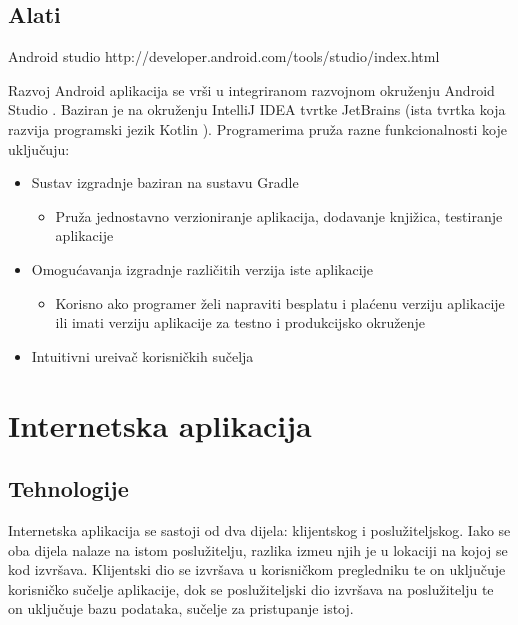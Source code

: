 \subsection{Alati}
Android studio
http://developer.android.com/tools/studio/index.html

Razvoj Android aplikacija se vr\v{s}i u integriranom razvojnom okru\v{z}enju Android Studio \cite{androidStudio}. Baziran je na okru\v{z}enju IntelliJ IDEA \cite{inteliJ} tvrtke JetBrains (ista tvrtka koja razvija programski jezik Kotlin \cite{kotlin}). Programerima pru\v{z}a razne funkcionalnosti koje uklju\v{c}uju:

\begin{itemize}
		\item Sustav izgradnje baziran na sustavu Gradle \cite{gradle}
		\begin{itemize}
			\item Pru\v{z}a jednostavno verzioniranje aplikacija, dodavanje knji\v{z}ica, testiranje aplikacije
		\end{itemize}
		\item Omogu\'{c}avanja izgradnje razli\v{c}itih verzija iste aplikacije
		\begin{itemize}
			\item Korisno ako programer \v{z}eli napraviti besplatu i pla\'{c}enu verziju aplikacije ili imati verziju aplikacije za testno i produkcijsko okru\v{z}enje
		\end{itemize}
		\item Intuitivni ure\dj iva\v{c} korisni\v{c}kih su\v{c}elja
	\end{itemize}


\section{Internetska aplikacija}

\subsection{Tehnologije}

Internetska aplikacija se sastoji od dva dijela: klijentskog i poslu\v{z}iteljskog. Iako se oba dijela nalaze na istom poslu\v{z}itelju, razlika izme\dj u njih je u lokaciji na kojoj se kod izvr\v{s}ava. Klijentski dio se izvr\v{s}ava u korisni\v{c}kom pregledniku te on uklju\v{c}uje korisni\v{c}ko su\v{c}elje aplikacije, dok se poslu\v{z}iteljski dio izvr\v{s}ava na poslu\v{z}itelju te on uklju\v{c}uje bazu podataka, su\v{c}elje za pristupanje istoj.


